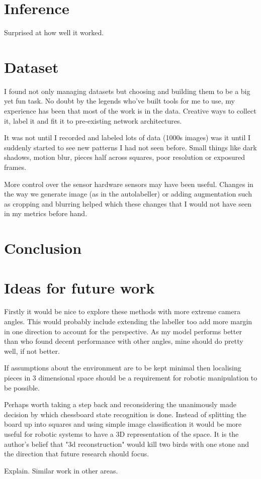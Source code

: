 \section{Inference}
Surprised at how well it worked.

\section{Dataset}
I found not only managing datasets but choosing and building them to be a big yet fun task.  No doubt by the legends who've built tools for me to use,
my experience has been that most of the work is in the data. Creative ways to collect it, label it and fit it to pre-existing network architectures.  

It was not until I recorded and labeled lots of data (1000s images) was it until I suddenly started to see new patterns I had not seen before.  Small 
things like dark shadows, motion blur, pieces half across squares, poor resolution or exposured frames.

More control over the sensor hardware sensors may have been useful.  Changes in the way we generate image (as in the autolabeller) or
adding augmentation such as cropping and blurring helped which these changes that I would not have seen in my metrics before hand.

\section{Conclusion}



\section{Ideas for future work}
Firstly it would be nice to explore these methods with more extreme camera angles.  This would probably include extending the labeller too add more 
margin in one direction to account for the perspective. As my model performs better than \cite{} who found decent performance with other angles, mine should 
do pretty well, if not better.

If assumptions about the environment are to be kept minimal
then localising pieces in 3 dimensional space should be a requirement for robotic manipulation to be possible.

Perhaps worth taking a step back and reconsidering the unanimously made decision by which chessboard state recognition is done.  Instead of splitting 
the board up into squares and using simple image classification it would be more useful for robotic systems to have a 3D representation of the space.
It is the author's belief that "3d reconstruction" would kill two birds with one stone and the direction that future research should focus. 

Explain.  Similar work in other areas.